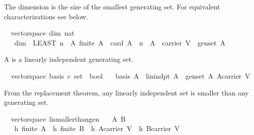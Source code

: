 \begin{isabellebody}
\begin{isamarkuptext}%
The dimension is the size of the smallest generating set. For equivalent
characterizations see below.%
\end{isamarkuptext}%
\isamarkuptrue%
\isamarkupfalse%
\ {\isacharparenleft}\ vectorspace{\isacharparenright}\ dim{\isacharcolon}{\isacharcolon}\ {\isachardoublequoteopen}nat{\isachardoublequoteclose}\isanewline
\ \ \ {\isachardoublequoteopen}dim\ {\isacharequal}\ {\isacharparenleft}LEAST\ n{\isachardot}\ {\isacharparenleft}{\isasymexists}\ A{\isachardot}\ {\isacharparenleft}{\isacharparenleft}finite\ A{\isacharparenright}\ {\isasymand}\ {\isacharparenleft}card\ A\ {\isacharequal}\ n{\isacharparenright}\ {\isasymand}\ {\isacharparenleft}A\ {\isasymsubseteq}\ carrier\ V{\isacharparenright}\ {\isasymand}\ {\isacharparenleft}gen{\isacharunderscore}set\ A{\isacharparenright}{\isacharparenright}{\isacharparenright}{\isacharparenright}{\isachardoublequoteclose}%
\begin{isamarkuptext}%
A  is a linearly independent generating set.%
\end{isamarkuptext}%
\isamarkuptrue%
\isamarkupfalse%
\ {\isacharparenleft}\ vectorspace{\isacharparenright}\ basis{\isacharcolon}{\isacharcolon}\ {\isachardoublequoteopen}{\isacharprime}c\ set\ {\isasymRightarrow}\ bool{\isachardoublequoteclose}\isanewline
\ \ \ {\isachardoublequoteopen}basis\ A\ {\isacharequal}\ {\isacharparenleft}{\isacharparenleft}lin{\isacharunderscore}indpt\ A{\isacharparenright}\ {\isasymand}\ {\isacharparenleft}gen{\isacharunderscore}set\ A{\isacharparenright}{\isasymand}\ {\isacharparenleft}A{\isasymsubseteq}carrier\ V{\isacharparenright}{\isacharparenright}{\isachardoublequoteclose}%
\begin{isamarkuptext}%
From the replacement theorem, any linearly independent set is smaller than any generating set.%
\end{isamarkuptext}%
\isamarkuptrue%
\isamarkupfalse%
\ {\isacharparenleft}\ vectorspace{\isacharparenright}\ li{\isacharunderscore}smaller{\isacharunderscore}than{\isacharunderscore}gen{\isacharcolon}\isanewline
\ \ \ A\ B\isanewline
\ \ \ h{}{\isacharcolon}\ {\isachardoublequoteopen}finite\ A{\isachardoublequoteclose}\ \ h{}{\isacharcolon}\ {\isachardoublequoteopen}finite\ B{\isachardoublequoteclose}\ \ h{}{\isacharcolon}\ {\isachardoublequoteopen}A{\isasymsubseteq}carrier\ V{\isachardoublequoteclose}\ \ h{}{\isacharcolon}\ {\isachardoublequoteopen}B{\isasymsubseteq}carrier\ V{\isachardoublequoteclose}\ \isanewline

\end{isabellebody}

